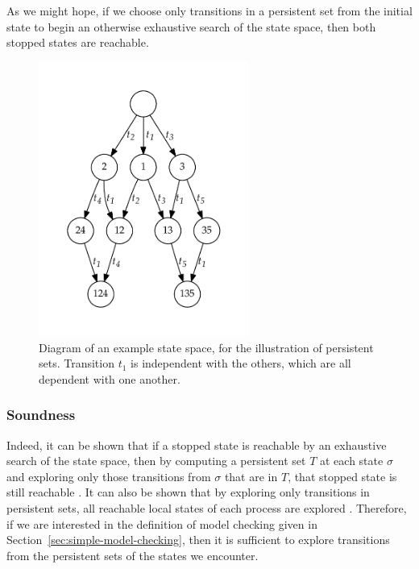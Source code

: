 \documentclass[12pt,a4paper,twoside,openright]{report}
\begin{document}
As we might hope, if we choose only transitions
in a persistent set
from the initial state to begin
an otherwise exhaustive search of the state space, then
both stopped states are reachable.

\begin{figure}
	\centering
	\includegraphics[height=9cm]{persistent1}
	\caption[Diagram of an example state space, for
	the illustration of persistent sets.]
		{Diagram of an example state space, for
		the illustration of persistent sets. Transition
		$t_1$ is independent with the others, which are
		all dependent with one another.}
	\label{fig:persistent}
\end{figure}

\subsubsection{Soundness}
Indeed, it can be shown that if a stopped state is reachable by an exhaustive
search of the state space, then by computing a persistent set $T$ at
each state $\sigma$ and exploring only those transitions from
$\sigma$ that are in $T$, that stopped state is still reachable
\cite[Theorem~4.3]{god96}. It can also be shown
that by exploring only transitions in persistent sets, all reachable
local states of each process are explored
\cite[Theorem~6.14]{god96}. Therefore, if we are interested in
the definition of model checking given in 
Section~\ref{sec:simple-model-checking}, then it is sufficient
to explore transitions from the persistent sets of the states we
encounter.
\end{document}
